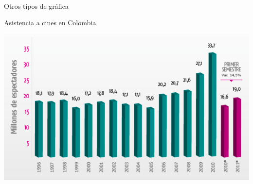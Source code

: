 \documentclass{bredelebeamer}
\begin{document}
\begin{frame}{Otros tipos de gráfica}
\begin{center}
Asistencia a cines en Colombia
\end{center}
\begin{center}
\includegraphics[scale=0.5]{images/img42.png}
\end{center}
\end{frame}
\end{document}
